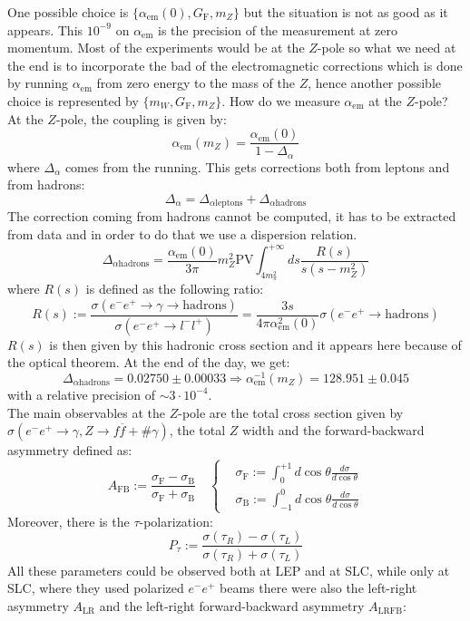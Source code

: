 \documentclass[../main.tex]{subfiles}
\begin{document}
One possible choice is $\{\alpha_{\text{em}}(0), G_{\text{F}}, m_Z \}$ but the situation is not as good as it appears. This $10^{-9}$ on $\alpha_{\text{em}}$ is the precision of the measurement at zero momentum. Most of the experiments would be at the $Z$-pole so what we need at the end is to incorporate the bad of the electromagnetic corrections which is done by running $\alpha_{\text{em}}$ from zero energy to the mass of the $Z$, hence another possible choice is represented by $\{m_W, G_{\text{F}}, m_Z\}$. How do we measure $\alpha_{\text{em}}$ at the $Z$-pole? At the $Z$-pole, the coupling is given by:
\[
\alpha_{\text{em}}(m_Z)=\frac{\alpha_{\text{em}}(0)}{1-\Delta_\alpha}
\]
where $\Delta_\alpha$ comes from the running. This gets corrections both from leptons and from hadrons:
\[
\Delta_\alpha=\Delta_{\alpha\text{leptons}}+\Delta_{\alpha\text{hadrons}}
\]
The correction coming from hadrons cannot be computed, it has to be extracted from data and in order to do that we use a dispersion relation.
\[
\Delta_{\alpha\text{hadrons}}=\frac{\alpha_{\text{em}}(0)}{3\pi}m_Z^2\text{PV}\int_{4m_\pi^2}^{+\infty}ds\frac{R(s)}{s(s-m_Z^2)}
\]
where $R(s)$ is defined as the following ratio:
\[
R(s):=\frac{\sigma(e^-e^+\to\gamma\to\text{hadrons})}{\sigma(e^-e^+\to l^-l^+)}=\frac{3s}{4\pi\alpha^2_{\text{em}}(0)}\sigma(e^-e^+\to\text{hadrons})
\]
$R(s)$ is then given by this hadronic cross section and it appears here because of the optical theorem. At the end of the day, we get:
\[
\Delta_{\alpha\text{hadrons}}=0.02750\pm0.00033\Rightarrow\alpha_{\text{em}}^{-1}(m_Z)=128.951\pm0.045
\]
with a relative precision of $\sim3\cdot10^{-4}$.\\
The main observables at the $Z$-pole are the total cross section given by $\sigma(e^-e^+\to\gamma,Z\to f\overline{f}+\#\gamma)$, the total $Z$ width and the forward-backward asymmetry defined as:
\[
A_{\text{FB}}:=\frac{\sigma_{\text{F}}-\sigma_{\text{B}}}{\sigma_{\text{F}}+\sigma_{\text{B}}} \quad \left\{\begin{aligned}
&\sigma_{\text{F}}:=\int_0^{+1}d\cos\theta\frac{d\sigma}{d\cos\theta}\\
&\sigma_{\text{B}}:=\int_{-1}^0d\cos\theta\frac{d\sigma}{d\cos\theta}
\end{aligned}\right.
\]
Moreover, there is the $\tau$-polarization:
\[
P_\tau:=\frac{\sigma(\tau_R)-\sigma(\tau_L)}{\sigma(\tau_R)+\sigma(\tau_L)}
\]
All these parameters could be observed both at LEP and at SLC, while only at SLC, where they used polarized $e^-e^+$ beams there were also the left-right asymmetry $A_{\text{LR}}$ and the left-right forward-backward asymmetry $A_{\text{LRFB}}$:
\end{document}
